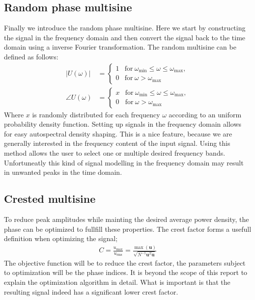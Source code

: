 \subsection{Random phase multisine}
Finally we introduce the random phase multisine. Here we start by constructing the signal in the frequency domain and then convert the signal back to the time domain using a inverse Fourier transformation. The random multisine can be defined as follows:
	\begin{align}
			|U(\omega)| &= \begin{cases} 1 & \mathrm{for}  \ \omega_\textrm{min} \le \omega \le \omega_\textrm{max}, \\ 0 & \mathrm{for}\ \omega > \omega_\textrm{max} \end{cases}  \\
			\angle U(\omega) &= \begin{cases} x & \mathrm{for}  \ \omega_\textrm{min} \le \omega \le \omega_\textrm{max}, \\ 0 & \mathrm{for}\ \omega > \omega_\textrm{max} \end{cases}  
	\end{align}
Where $x$ is randomly distributed for each frequency $\omega$ according to an uniform probability density function.
Setting up signals in the frequency domain allows for easy autospectral density shaping. This is a nice feature, because we are generally interested in the frequency content of the input signal. Using this method allows the user to select one or multiple desired frequency bands. Unfortuneatly this kind of signal modelling in the frequency domain may result in unwanted peaks in the time domain.
\subsection{Crested multisine}
To reduce peak amplitudes while mainting the desired average power density, the phase can be optimized to fullfill these properties. The crest factor forms a usefull definition when optimizing the signal;
\begin{align}
    C = \frac{u_\textrm{max}}{u_\textrm{rms}} = \frac{\max(\mathbf{u})}{\sqrt{N^{-1}\mathbf{u}^T\mathbf{u}}}
\end{align}
The objective function will be to reduce the crest factor, the parameters subject to optimization will be the phase indices. It is beyond the scope of this report to explain the optimization algorithm in detail. What is important is that the resulting signal indeed has a significant lower crest factor. 
